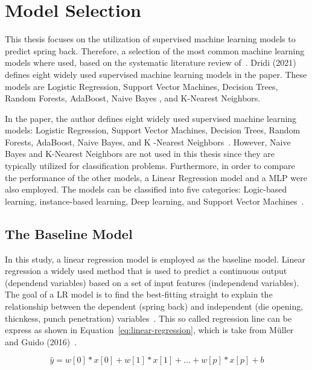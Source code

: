 \section{Model Selection}\label{sec:model-selection}
This thesis focuses on the utilization of supervised machine learning models to predict
spring back.
Therefore, a selection of the most common machine learning models where used, based on
the systematic literature review of~\cite{dridi2021supervised}.
Dridi (2021) defines eight widely used supervised machine learning models in the paper.
These models are Logistic Regression, Support Vector Machines, Decision Trees, Random Forests, AdaBoost, Naive Bayes
, and K-Nearest Neighbors.

In the paper, the author defines eight widely used supervised machine learning models: Logistic
Regression, Support Vector Machines, Decision Trees, Random Forests, AdaBoost, Naive Bayes,
and K -Nearest Neighbors~\cite[p. 8]{dridi2021supervised}.
However, Naive Bayes and K-Nearest Neighbors are not used in this thesis since they are typically
utilized for classification problems.
Furthermore, in order to compare the performance of the other models, a Linear Regression model
and a \ac{MLP} were also employed.
The models can be classified into five categories: Logic-based learning, instance-based learning, Deep learning, and
Support Vector Machines~\cite[p. 8]{dridi2021supervised}.

\subsection{The Baseline Model}\label{subsec:regression-models}
In this study, a linear regression model is employed as the baseline model.
Linear regression a widely used method that is used to predict a continuous output (dependend variables) based on a set
of input features (independend variables).
The goal of a \ac{LR} model is to find the best-fitting straight to explain the relationship between the dependent
(spring back) and independent (die opening, thicnkess, punch penetration)
variables~\cite[p. 45]{muller_introductionmachinelearning_2016}.
This so called regression line can be express as shown in Equation~\ref{eq:linear-regression}, which is take from
Müller and Guido (2016)~\cite[p. 45]{muller_introductionmachinelearning_2016}.

\begin{tcolorbox}[arc=0pt,boxrule=0.5pt]
    \begin{equation}
        \hat{y} = w[0] * x[0] + w[1] * x[1] + ... + w[p] * x[p] + b
        \label{eq:linear-regression}
    \end{equation}
\end{tcolorbox}

